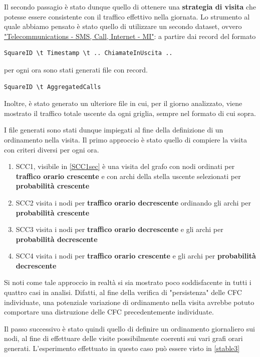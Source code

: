 \documentclass[10pt,a4paper]{article}
\begin{document}
Il secondo passagio è stato dunque quello di ottenere una \textbf{strategia di visita} che potesse essere consistente con il traffico effettivo nella giornata.
Lo strumento al quale abbiamo pensato è stato quello di utilizzare un secondo dataset, ovvero \href{https://dandelion.eu/datagem/telecom-sms-call-internet-mi/description/}{"Telecommunications - SMS, Call, Internet - MI"}:
a partire dai record del formato
\begin{verbatim}
SquareID \t Timestamp \t .. ChiamateInUscita ..
\end{verbatim}
per ogni ora sono stati generati file con record.
\begin{verbatim}
SquareID \t AggregatedCalls
\end{verbatim}
Inoltre, è stato generato un ulteriore file in cui, per il giorno analizzato, viene mostrato il traffico totale uscente da ogni griglia, sempre nel formato di cui sopra.

I file generati sono stati dunque impiegati al fine della definizione di un ordinamento nella visita.
Il primo approccio è stato quello di compiere la visita con criteri diversi per ogni ora. 
\begin{enumerate}
\item SCC1, visibile in \ref{SCC1sec} è una visita del grafo con nodi ordinati per \textbf{traffico orario crescente} e con archi della stella uscente selezionati per \textbf{probabilità crescente} 
\item SCC2 visita i nodi per \textbf{traffico orario decrescente} ordinando gli archi per \textbf{probabilità crescente}
\item SCC3 visita i nodi per \textbf{traffico orario decrescente} e gli archi per \textbf{probabilità decrescente}
\item SCC4 visita i nodi per \textbf{traffico orario crescente} e gli archi per \textbf{probabilità decrescente}
\end{enumerate}
Si noti come tale approccio in realtà si sia mostrato poco soddisfacente in tutti i quattro casi in analisi. Difatti, al fine della verifica di "persistenza" delle CFC individuate, una potenziale variazione di ordinamento nella visita avrebbe potuto comportare una distruzione delle CFC precedentemente individuate.

Il passo successivo è stato quindi quello di definire un ordinamento giornaliero sui nodi, al fine di effettuare delle visite possibilmente coerenti sui vari grafi orari generati. L'esperimento effettuato in questo caso può essere visto in \ref{stable3}
\end{document}

